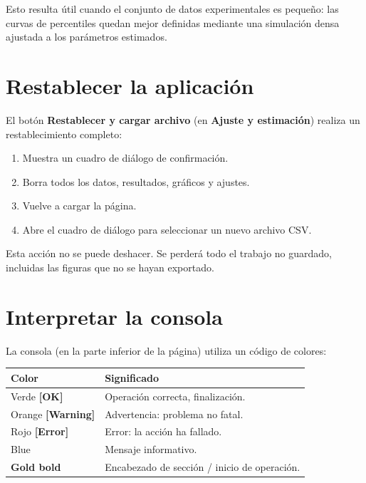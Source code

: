 \documentclass[11pt,a4paper]{article}
\begin{document}
\begin{tipbox}[Aplicación]
Esto resulta útil cuando el conjunto de datos experimentales es pequeño: las curvas de percentiles quedan mejor definidas mediante una simulación densa ajustada a los parámetros estimados.
\end{tipbox}

\section{Restablecer la aplicación}

El botón \textbf{Restablecer y cargar archivo} (en \textbf{Ajuste y estimación}) realiza un restablecimiento completo:

\begin{enumerate}[leftmargin=1.4em]
  \item Muestra un cuadro de diálogo de confirmación.
  \item Borra todos los datos, resultados, gráficos y ajustes.
  \item Vuelve a cargar la página.
  \item Abre el cuadro de diálogo para seleccionar un nuevo archivo CSV.
\end{enumerate}

\begin{warnbox}[Irreversible]
Esta acción no se puede deshacer. Se perderá todo el trabajo no guardado, incluidas las figuras que no se hayan exportado.
\end{warnbox}

\section{Interpretar la consola}

La consola (en la parte inferior de la página) utiliza un código de colores:

\begin{center}
\begin{tabular}{ll}
\toprule
\textbf{Color} & \textbf{Significado} \\
\midrule
\textcolor{greenhl}{Verde \textbf{[OK]}} & Operación correcta, finalización. \\
\textcolor{warnhl}{Orange \textbf{[Warning]}} & Advertencia: problema no fatal. \\
\textcolor{redhl}{Rojo \textbf{[Error]}} & Error: la acción ha fallado. \\
\textcolor{bluehl}{Blue} & Mensaje informativo. \\
\textcolor{accent}{\textbf{Gold bold}} & Encabezado de sección / inicio de operación. \\
\bottomrule
\end{tabular}
\end{center}
\end{document}
